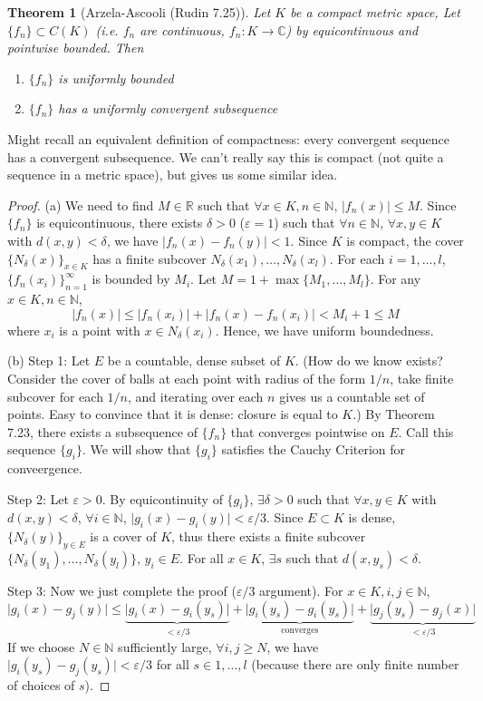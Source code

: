 \documentclass{article}
\theoremstyle{plain}
\newtheorem{theorem}{Theorem}
\theoremstyle{remark}
\newcommand{\N}{{\mathbb N}}
\newcommand{\R}{{\mathbb R}}
\newcommand{\C}{{\mathbb C}}
\newcommand{\ep}{{\varepsilon}}
\begin{document}
\begin{theorem}[Arzela-Ascooli (Rudin 7.25)]
	Let $K$ be a compact metric space,
	Let $\{f_n\} \subset C(K)$ (i.e. $f_n$ are continuous, $f_n \colon K \to \C$)
	by equicontinuous and pointwise bounded. Then
	\begin{enumerate}
		\item[(a)] $\{f_n\}$ is uniformly bounded
		\item[(b)] $\{f_n\}$ has a uniformly convergent subsequence
	\end{enumerate}
\end{theorem}
Might recall an equivalent definition of compactness:
every convergent sequence has a convergent subsequence.
We can't really say this is compact (not quite a sequence in a metric space),
but gives us some similar idea.

\begin{proof}
	(a) We need to find $M \in \R$ such that $\forall x \in K, n \in \N$,
	$\lvert f_n(x) \rvert \leq M$.
	Since $\{f_n\}$ is equicontinuous, there exists $\delta > 0$ ($\ep = 1$)
	such that $\forall n \in \N$, $\forall x,y \in K$ with $d(x,y) < \delta$,
	we have $\lvert f_n(x) - f_n(y) \rvert < 1$.
	Since $K$ is compact,
	the cover $\{N_\delta(x)\}_{x \in K}$ has a finite subcover
	$N_\delta(x_1),\dots,N_\delta(x_l)$.
	For each $i = 1,\dots,l$, $\{f_n(x_i)\}_{n=1}^\infty$ is bounded by $M_i$.
	Let $M = 1 + \max\{M_1,\dots,M_l\}$.
	For any $x \in K,n\in\N$,
	\[
		\lvert f_n(x) \rvert \leq
		\lvert f_n(x_i) \rvert + \lvert f_n(x) - f_n(x_i)\rvert
		< M_i + 1 \leq M
	\]
	where $x_i$ is a point with $x \in N_\delta(x_i)$.
	Hence, we have uniform boundedness.

	(b) Step 1: Let $E$ be a countable, dense subset of $K$.
	(How do we know exists?
	Consider the cover of balls at each point with radius of the form $1/n$,
	take finite subcover for each $1/n$, and iterating over each $n$
	gives us a countable set of points.
	Easy to convince that it is dense: closure is equal to $K$.)
	By Theorem 7.23, there exists a subsequence of $\{f_n\}$
	that converges pointwise on $E$.
	Call this sequence $\{g_i\}$.
	We will show that $\{g_i\}$ satisfies the Cauchy Criterion for conveergence.

	Step 2: Let $\ep > 0$. By equicontinuity of $\{g_i\}$,
	$\exists \delta > 0$ such that $\forall x,y \in K$ with $d(x,y) < \delta$,
	$\forall i \in \N$, $\lvert g_i(x) - g_i(y) \rvert < \ep/3$.
	Since $E \subset K$ is dense, $\{N_\delta(y)\}_{y \in E}$ is a cover of $K$,
	thus there exists a finite subcover $\{N_\delta(y_1),\dots,N_\delta(y_l)\}$, $y_i \in E$.
	For all $x \in K$, $\exists s$ such that $d(x,y_s) < \delta$.
	
	Step 3: Now we just complete the proof ($\ep/3$ argument).
	For $x \in K, i,j \in \N$,
	\[
		\lvert g_i(x) - g_j(y) \rvert \leq \underbrace{\lvert g_i(x) - g_i(y_s) \rvert}_{<\ep/3}
		+ \underbrace{\lvert g_i(y_s) - g_i(y_s)\rvert}_{\text{converges}}
		+ \underbrace{\lvert g_j(y_s) - g_j(x) \rvert}_{<\ep/3}
	\]
	If we choose $N \in \N$ sufficiently large,
	$\forall i,j \geq N$, we have $\lvert g_i(y_s) - g_j(y_s) \rvert < \ep/3$
	for all $s \in 1,\dots,l$
	(because there are only finite number of choices of $s$).
\end{proof}
\end{document}
